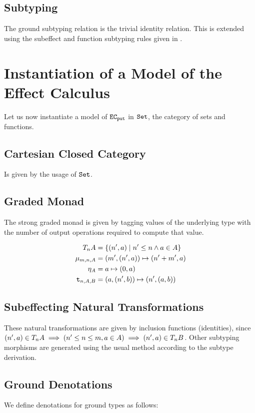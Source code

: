 \documentclass{Report}
\begin{document}
    \subsection{Subtyping}
    The ground subtyping relation is the trivial identity relation. This is extended using the subeffect and function subtyping rules given in .


    \section{Instantiation of a Model of the Effect Calculus}

    Let us now instantiate a model of $\texttt{EC}_{\texttt{put}}$ in $\texttt{Set}$, the category of sets and functions.

    \subsection{Cartesian Closed Category}
    Is given by the usage of $\texttt{Set}$.
    
    \subsection{Graded Monad}
    The strong graded monad is given by tagging values of the underlying type with the number of output operations required to compute that value.

    \begin{align}
        \label{AdequacyGradedMonad}
        T_{n}{A} & = \{(n', a) \mid n'\leq n\wedge a\in A \}\\
        \mu_{m, n, A} & = (m', (n', a))\mapsto (n' + m', a)\\
        \eta_{A} & = a\mapsto (0, a)\\\
        \texttt{t}_{n, A, B} & = (a, (n', b)) \mapsto (n', (a, b))
    \end{align}


\subsection{Subeffecting Natural Transformations}
These natural transformations are given by inclusion functions (identities), since $(n',a)\in T_{n}{A} \implies (n'\leq n \leq m, a\in A)\implies (n',a)\in T_{n}{B}$. Other subtyping morphisms are generated using the usual method according to the subtype derivation.

\subsection{Ground Denotations}
We define denotations for ground types as follows:
\end{document}
